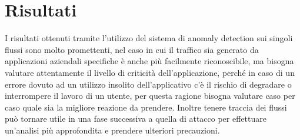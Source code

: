 \section{Risultati}

I risultati ottenuti tramite l'utilizzo del sistema di anomaly detection sui singoli flussi sono molto promettenti, nel caso in cui il traffico sia generato da applicazioni aziendali specifiche è anche più facilmente riconoscibile, ma bisogna valutare attentamente il livello di criticità dell'applicazione, perché in caso di un errore dovuto ad un utilizzo insolito dell'applicativo c'è il rischio di degradare o interrompere il lavoro di un utente, per questa ragione bisogna valutare caso per caso quale sia la migliore reazione da prendere.
Inoltre tenere traccia dei flussi può tornare utile in una fase successiva a quella di attacco per effettuare un'analisi più approfondita e prendere ulteriori precauzioni.